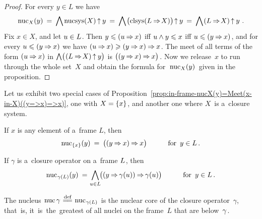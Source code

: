\documentclass[11pt,letterpaper]{article}
\renewcommand{\thmskip}{\bigskip}
\renewcommand{\interskip}{\medskip}
\renewcommand{\inskip}{\smallskip}
\begin{document}
\begin{proof}
For every $y\in L$ we have
%
\begin{equation*}
\mathop{\smash{\mathrm{nuc}}}\nolimits_X(y) \:=\: \bigwedge\mspace{-1mu}\mathop{\smash{\mathrm{nucsys}}}\nolimits(X)\mspace{-1mu}\mathbin{\uparrow} y
	\:=\: \bigwedge\mspace{1mu}\bigl(\mathop{\smash{\mathrm{clsys}}}\nolimits(L\mathbin{\Rightarrow}\mspace{-2mu} X)\bigr)\mspace{-2mu}\mathbin{\uparrow} y
	\:=\: \bigwedge\mspace{1mu}(L\mathbin{\Rightarrow}\mspace{-2mu} X)\mspace{-1mu}\mathbin{\uparrow} y~.
\end{equation*}
%
Fix $x\in X$, and let $u\in L\mspace{1mu}$.
Then $y\leqslant(u\mathbin{\Rightarrow} x)$ iff $u\wedge y\leqslant x$ iff $u\leqslant (y\mathbin{\Rightarrow} x)\mspace{1mu}$,
and for every $u\leqslant(y\mathbin{\Rightarrow} x)$ we have $(u\mathbin{\Rightarrow} x)\geqslant(y\mathbin{\Rightarrow} x)\mathbin{\Rightarrow} x\mspace{1mu}$.
The meet of all terms of the form $(u\mathbin{\Rightarrow} x)$ in
	$\mathop{\textstyle\bigwedge}\nolimits\bigl(\mspace{1mu}(L\mathbin{\Rightarrow}\mspace{-2mu} X)\mspace{-1mu}\mathbin{\uparrow} y\bigr)$
is $\bigl((y\mathbin{\Rightarrow} x)\mathbin{\Rightarrow} x\bigr)\mspace{1mu}$.
Now we release~$x$ to run through the whole set~$X$
and obtain the formula for~$\mspace{2mu}\mathop{\smash{\mathrm{nuc}}}\nolimits_X(y)\mspace{2mu}$ given in the proposition.
\end{proof}

\thmskip

Let us exhibit two special cases of
	Proposition~\ref{prop:in-frame-nucX(y)=Meet(x-in-X)((y=>x)=>x)},
one with $X=\{ x \}\mspace{1mu}$, and another one where $X$~is a~closure system.

\thmskip

\begin{corollary}\label{cor:in-frame-nucx(y)=((y=>x)=>x)}
If\/ $x$ is any element of a~frame\/ $L$, then
%
\begin{equation*}
\mathop{\smash{\mathrm{nuc}}}\nolimits_{\{ x \}}(y) \:=\: \bigl((y\mathbin{\Rightarrow} x)\mathbin{\Rightarrow} x\bigr)
			\qquad\quad \text{\rm for\, $y\in L$}\,.
\end{equation*}
%
\end{corollary}

\interskip

\begin{corollary}\label{cor:in-frame-nucC(y)=Meet(x-in-X)((y=>gamma(x))=>gamma(x))}
If\/ $\gamma$ is a~closure operator on a~frame\/ $L\mspace{1mu}$, then
%
\begin{equation*}
\mathop{\smash{\mathrm{nuc}}}\nolimits_{\mspace{1mu}\gamma(L)}(y) \:=\:\!
	\bigwedge_{u\in L}\!\bigl((y\mathbin{\Rightarrow}\mspace{-1mu}\gamma(u))\mathbin{\Rightarrow}\mspace{-1mu}\gamma(u)\bigr)
			\qquad\quad \text{\rm for\, $y\in L$}\,.
\end{equation*}
%
\end{corollary}

\negdisplayshortskip
\thmskip

The nucleus $\mspace{2mu}\mathop{\smash{\mathrm{nuc}}}\nolimits\gamma \mathrel{\overset{\text{def}}{\mspace{1mu}=\!=\mspace{1mu}}} \mathop{\smash{\mathrm{nuc}}}\nolimits_{\mspace{1mu}\gamma(L)}\mspace{1mu}$
	is the nuclear core of the closure operator~$\gamma$,
that~is,
it~is~the~greatest of all nuclei on the frame~$L$ that are below~$\gamma\mspace{1mu}$.
\end{document}
